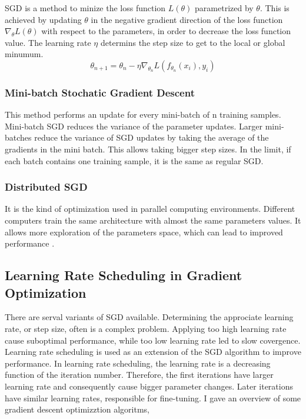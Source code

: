     SGD is a method to minize the loss function \(L(\theta)\)  parametrized by $\theta$. This is achieved by updating $\theta$ in the negative gradient direction of the loss function $\nabla_{\theta}L(\theta)$ with respect to the parameters, in order to decrease the loss function value. The learning rate $\eta$ determins the step size to get to the local or global minumum. 
    \begin{equation}
        \theta_{n+1} = \theta_{n} - \eta \nabla_{\theta_{n}}L(f_{\theta_{n}}(x_i), y_i)
    \end{equation}

    \subsubsection{Mini-batch Stochatic Gradient Descent}
    This method performs an update for every mini-batch of n training samples. Mini-batch SGD reduces the variance of the parameter updates. Larger mini-batches reduce the variance of SGD updates by taking the average of the gradients in the mini batch. This allows taking bigger step sizes. In the limit, if each batch contains one training sample, it is the same as regular SGD.

    \subsubsection{Distributed SGD}
    It is the kind of optimization used in parallel computing environments. Different computers train the same architecture with almost the same parameters values. It allows more exploration of the parameters space, which can lead to improved performance \cite{zhang2015deep}.

    \subsection{Learning Rate Scheduling in Gradient Optimization}
    \label{learning}
    There are serval variants of SGD available. Determining the approciate learning rate, or step size, often is a complex problem. Applying too high learning rate cause suboptimal performance, while too low learning rate led to slow covergence. Learning rate scheduling is used as an extension of the SGD algorithm to improve performance. In learning rate scheduling, the learning rate is a decreasing function of the iteration number. Therefore, the first iterations have larger learning rate and consequently cause bigger parameter changes. Later iterations have similar learning rates, responsible for fine-tuning. I gave an overview of some gradient descent optimizztion algoritms,

